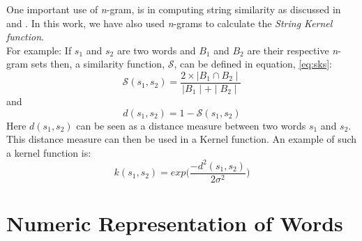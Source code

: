 One important use of \textit{n}-gram, is in computing string similarity as discussed in \cite{martins2006string} and \cite{bauc}.  In this work, we have also used \textit{n}-grams to calculate the \textit{String Kernel function}.\\
For example: If $s_1$ and $s_2$ are two words and $B_1$ and $B_2$ are their respective \textit{n}-gram sets then, a similarity function, $\mathcal{S}$, can be defined in equation, \ref{eq:sks}:\\
\begin{equation}\label{eq:sks}
\mathcal{S}(s_1,s_2) = \frac{2\times\mid B_1\cap B_2\mid}{\mid B_1 \mid + \mid B_2 \mid}
\end{equation}
and
\begin{equation}
d(s_1,s_2) = 1- \mathcal{S}(s_1,s_2)
\end{equation}
Here $d(s_1,s_2)$ can be seen as a distance measure between two words $s_1$ and $s_2$. This distance measure can then be used in a Kernel function. An example of such a kernel function is:
\begin{equation}
k(s_1,s_2) = exp\Bigg(\dfrac{-d^2(s_1,s_2)}{2\sigma^2}\Bigg)
\end{equation}
\section{Numeric Representation of Words}

